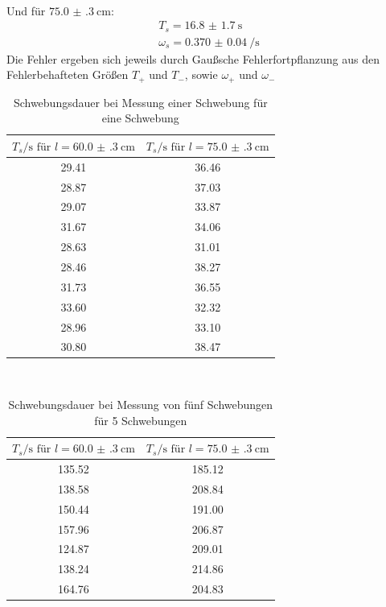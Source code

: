 \\
Und für $\SI{75.0(3)}{\centi\metre}$:
\begin{equation*}
  \begin{split}
  T_s = \SI{16.8(17)}{\second} \\
  \omega_s = \SI{0.370(40)}{\per\second}
\end{split}
\end{equation*}
Die Fehler ergeben sich jeweils durch Gaußsche Fehlerfortpflanzung aus den Fehlerbehafteten Größen $T_+$ und $T_-$, sowie $\omega_+$ und $\omega_-$
\\
\begin{table}[b]
  \centering
  \caption{Schwebungsdauer bei Messung einer Schwebung für eine Schwebung}
  \label{tab:data3}
  \begin{tabular}{c c}
    \toprule
    $T_{s}/\si{\second} \text{ für } l=\SI{60.0(3)}{\centi\metre}$ & $T_{s}/\si{\second} \text{ für } l=\SI{75.0(3)}{\centi\metre}$ \\
    \midrule
    29.41 & 36.46 \\
    28.87 & 37.03 \\
    29.07 & 33.87 \\
    31.67 & 34.06 \\
    28.63 & 31.01 \\
    28.46 & 38.27 \\
    31.73 & 36.55 \\
    33.60 & 32.32 \\
    28.96 & 33.10 \\
    30.80 & 38.47 \\
    \bottomrule
  \end{tabular}
\end{table}
\\
\begin{table}[b]
  \centering
  \caption{Schwebungsdauer bei Messung von fünf Schwebungen für 5 Schwebungen}
  \label{tab:data4}
  \begin{tabular}{c c}
    \toprule
  $T_{s}/\si{\second} \text{ für } l=\SI{60.0(3)}{\centi\metre}$ & $T_{s}/\si{\second} \text{ für } l=\SI{75.0(3)}{\centi\metre}$ \\
    \midrule
    135.52 & 185.12 \\
    138.58 & 208.84 \\
    150.44 & 191.00 \\
    157.96 & 206.87 \\
    124.87 & 209.01 \\
    138.24 & 214.86 \\
    164.76 & 204.83 \\
    \bottomrule
  \end{tabular}
\end{table}
